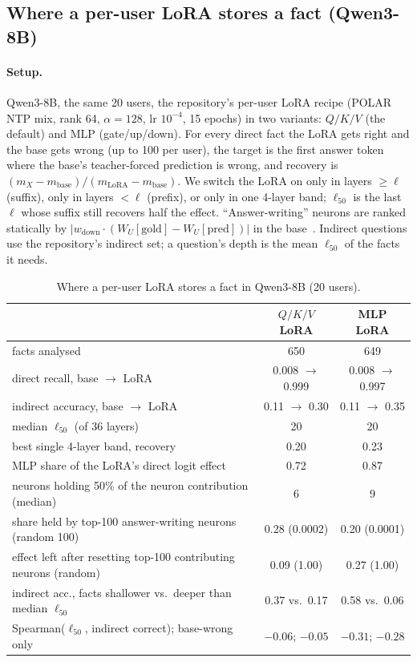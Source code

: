 \documentclass[11pt]{article}
\begin{document}
\subsection{Where a per-user LoRA stores a fact (Qwen3-8B)}
\label{app:followup-lora}

\paragraph{Setup.} Qwen3-8B, the same 20 users, the repository's
per-user LoRA recipe (POLAR NTP mix, rank 64, $\alpha=128$, lr
$10^{-4}$, 15 epochs) in two variants: $Q/K/V$ (the default) and MLP
(gate/up/down). For every direct fact the LoRA gets right and the base
gets wrong (up to 100 per user), the target is the first answer token
where the base's teacher-forced prediction is wrong, and recovery is
$(m_X-m_{\text{base}})/(m_{\text{LoRA}}-m_{\text{base}})$. We switch
the LoRA on only in layers $\geq\ell$ (suffix), only in layers $<\ell$
(prefix), or only in one 4-layer band; $\ell_{50}$ is the last $\ell$
whose suffix still recovers half the effect. ``Answer-writing''
neurons are ranked statically by $|w_{\text{down}}\cdot(W_U[\text{gold}]-W_U[\text{pred}])|$
in the base~\citep{geva2022ffn}. Indirect questions use the
repository's indirect set; a question's depth is the mean $\ell_{50}$
of the facts it needs.

\begin{table}[t]
\centering
\caption{Where a per-user LoRA stores a fact in Qwen3-8B (20 users).}
\label{tab:followup-lora}
\small
\begin{tabular}{lcc}
\toprule
 & $Q/K/V$ LoRA & MLP LoRA \\
\midrule
facts analysed & 650 & 649 \\
direct recall, base $\to$ LoRA & 0.008 $\to$ 0.999 & 0.008 $\to$ 0.997 \\
indirect accuracy, base $\to$ LoRA & 0.11 $\to$ 0.30 & 0.11 $\to$ 0.35 \\
median $\ell_{50}$ (of 36 layers) & 20 & 20 \\
best single 4-layer band, recovery & 0.20 & 0.23 \\
MLP share of the LoRA's direct logit effect & 0.72 & 0.87 \\
neurons holding 50\% of the neuron contribution (median) & 6 & 9 \\
share held by top-100 answer-writing neurons (random 100) & 0.28 (0.0002) & 0.20 (0.0001) \\
effect left after resetting top-100 contributing neurons (random) & 0.09 (1.00) & 0.27 (1.00) \\
indirect acc., facts shallower vs.\ deeper than median $\ell_{50}$ & 0.37 vs.\ 0.17 & 0.58 vs.\ 0.06 \\
Spearman($\ell_{50}$, indirect correct); base-wrong only & $-0.06$; $-0.05$ & $-0.31$; $-0.28$ \\
\bottomrule
\end{tabular}
\end{table}
\end{document}
